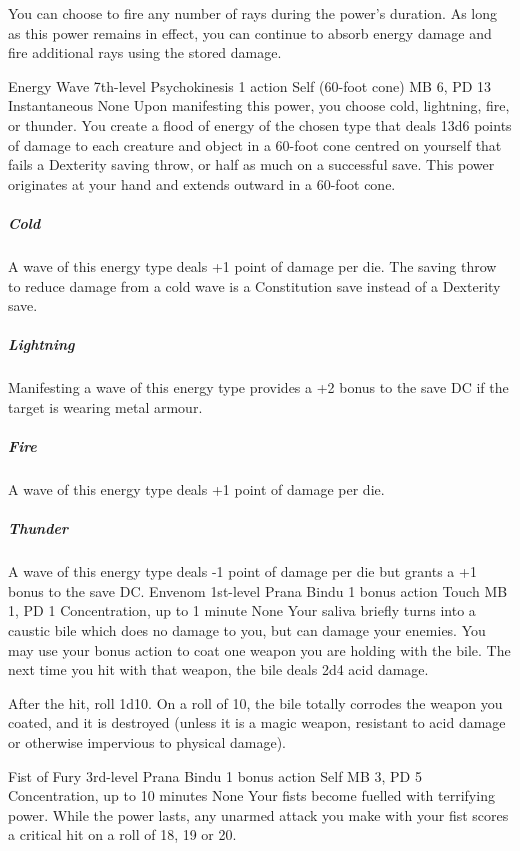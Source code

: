 You can choose to fire any number of rays during the power's
duration. As long as this power remains in effect, you can
continue to absorb energy damage and fire additional rays
using the stored damage.

\DndPowerHeader%
    {Energy Wave\label{pwr:energy_wave}}
    {7th-level Psychokinesis}
    {1 action}
    {Self (60-foot cone)}
    {MB 6, PD 13}
    {Instantaneous}
    {None}
Upon manifesting this power,
you choose cold, lightning, fire, or thunder.
You create a flood of energy of the chosen type
that deals 13d6 points of damage
to each creature and object in a 60-foot cone
centred on yourself that fails a Dexterity saving throw,
or half as much on a successful save.
This power originates at your hand
and extends outward in a 60-foot cone.

\subparagraph{Cold}
A wave of this energy type deals +1 point
of damage per die.
The saving throw to reduce damage from a cold wave
is a Constitution save instead of a Dexterity save.  

\subparagraph{Lightning}
Manifesting a wave of this energy type
provides a +2 bonus to the save DC if the target is wearing
metal armour.

\subparagraph{Fire}
A wave of this energy type deals +1 point of damage per die.

\subparagraph{Thunder}
A wave of this energy type deals -1 point of damage per die
but grants a +1 bonus to the save DC.
\DndPowerHeader%
    {Envenom\label{pwr:envenom}}
    {1st-level Prana Bindu}
    {1 bonus action}
    {Touch}
    {MB 1, PD 1}
    {Concentration, up to 1 minute}
    {None}
Your saliva briefly turns into a caustic
bile which does no damage to you, but can damage your enemies.
You may use your bonus action to coat one weapon you are holding
with the bile. The next time you hit with that weapon, the
bile deals 2d4 acid damage.

After the hit, roll 1d10. On a roll of 10, the bile totally
corrodes the weapon you coated, and it is destroyed (unless
it is a magic weapon, resistant to acid damage or otherwise
impervious to physical damage).

\DndPowerHeader%
    {Fist of Fury\label{pwr:fist_of_fury}}
    {3rd-level Prana Bindu}
    {1 bonus action}
    {Self}
    {MB 3, PD 5}
    {Concentration, up to 10 minutes}
    {None}
Your fists become fuelled with terrifying
power. While the power lasts, any unarmed attack you make
with your fist scores a critical hit on a roll of 18, 19 or
20.

